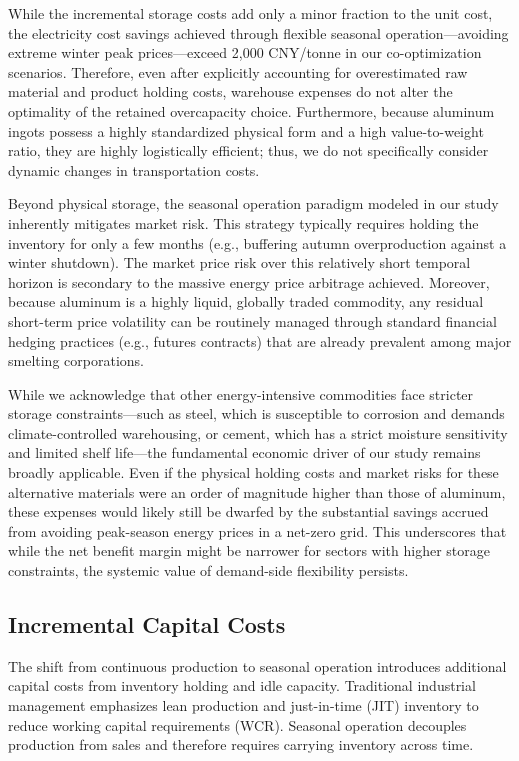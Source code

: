 \documentclass[preprint,12pt]{elsarticle}
\begin{document}
While the incremental storage costs add only a minor fraction to the unit cost, the electricity cost savings achieved through flexible seasonal operation—avoiding extreme winter peak prices—exceed 2,000 CNY/tonne in our co-optimization scenarios. Therefore, even after explicitly accounting for overestimated raw material and product holding costs, warehouse expenses do not alter the optimality of the retained overcapacity choice. Furthermore, because aluminum ingots possess a highly standardized physical form and a high value-to-weight ratio, they are highly logistically efficient; thus, we do not specifically consider dynamic changes in transportation costs.

Beyond physical storage, the seasonal operation paradigm modeled in our study inherently mitigates market risk. This strategy typically requires holding the inventory for only a few months (e.g., buffering autumn overproduction against a winter shutdown). The market price risk over this relatively short temporal horizon is secondary to the massive energy price arbitrage achieved. Moreover, because aluminum is a highly liquid, globally traded commodity, any residual short-term price volatility can be routinely managed through standard financial hedging practices (e.g., futures contracts) that are already prevalent among major smelting corporations.

While we acknowledge that other energy-intensive commodities face stricter storage constraints—such as steel, which is susceptible to corrosion and demands climate-controlled warehousing, or cement, which has a strict moisture sensitivity and limited shelf life—the fundamental economic driver of our study remains broadly applicable. Even if the physical holding costs and market risks for these alternative materials were an order of magnitude higher than those of aluminum, these expenses would likely still be dwarfed by the substantial savings accrued from avoiding peak-season energy prices in a net-zero grid. This underscores that while the net benefit margin might be narrower for sectors with higher storage constraints, the systemic value of demand-side flexibility persists.

\subsection{Incremental Capital Costs}

The shift from continuous production to seasonal operation introduces additional capital costs from inventory holding and idle capacity. Traditional industrial management emphasizes lean production and just-in-time (JIT) inventory to reduce working capital requirements (WCR). Seasonal operation decouples production from sales and therefore requires carrying inventory across time.
\end{document}
